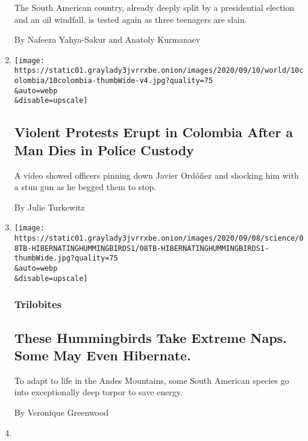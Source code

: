 \begin{enumerate}
  The South American country, already deeply split by a presidential
  election and an oil windfall, is tested again as three teenagers are
  slain.

  By Nafeeza Yahya-Sakur and Anatoly Kurmanaev
\item
  \href{/2020/09/10/world/americas/colombia-javier-ordonez-police.html}{}

  \texttt{[image: https://static01.graylady3jvrrxbe.onion/images/2020/09/10/world/10colombia/10colombia-thumbWide-v4.jpg?quality=75\\\&auto=webp\\\&disable=upscale]}

  \hypertarget{violent-protests-erupt-in-colombia-after-a-man-dies-in-police-custody}{%
  \subsection{Violent Protests Erupt in Colombia After a Man Dies in
  Police
  Custody}\label{violent-protests-erupt-in-colombia-after-a-man-dies-in-police-custody}}

  A video showed officers pinning down Javier Ordóñez and shocking him
  with a stun gun as he begged them to stop.

  By Julie Turkewitz
\item
  \href{/2020/09/08/science/hummingbirds-torpor-hibernation.html}{}

  \texttt{[image: https://static01.graylady3jvrrxbe.onion/images/2020/09/08/science/08TB-HIBERNATINGHUMMINGBIRDS1/08TB-HIBERNATINGHUMMINGBIRDS1-thumbWide.jpg?quality=75\\\&auto=webp\\\&disable=upscale]}

  \hypertarget{trilobites}{%
  \subsubsection{Trilobites}\label{trilobites}}

  \hypertarget{these-hummingbirds-take-extreme-naps-some-may-even-hibernate}{%
  \subsection{These Hummingbirds Take Extreme Naps. Some May Even
  Hibernate.}\label{these-hummingbirds-take-extreme-naps-some-may-even-hibernate}}

  To adapt to life in the Andes Mountains, some South American species
  go into exceptionally deep torpor to save energy.

  By Veronique Greenwood
\item
  \href{/2020/09/08/obituaries/cecilia-romo-dead-coronavirus.html}{}


\end{enumerate}
